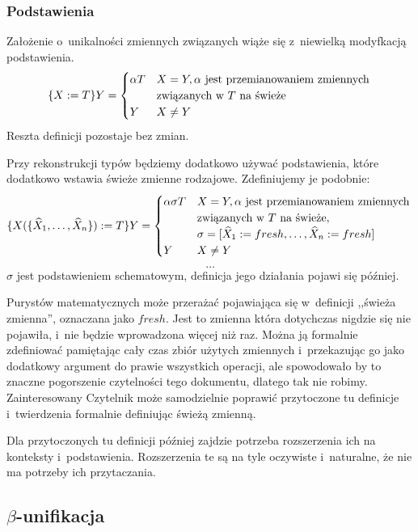 \documentclass[11pt,leqno]{article}
\begin{document}
\subsubsection{Podstawienia}

Założenie o~unikalności zmiennych związanych wiąże się z~niewielką modyfkacją podstawienia.
\[
\{X := T\} Y = 
	\begin{cases}
		\alpha T & X=Y, \alpha \ \textrm{jest przemianowaniem zmiennych} \\
		& \textrm{związanych w~$T$ na świeże} \\
		Y & X \neq Y
	\end{cases} \\
\]
Reszta definicji pozostaje bez zmian.

Przy rekonstrukcji typów będziemy dodatkowo używać podstawienia, które dodatkowo wstawia świeże zmienne rodzajowe.
Zdefiniujemy je podobnie:
\[
\{X(\{\widehat{X}_1, \dots, \widehat{X}_n\}) := T\} Y = 
	\begin{cases}
		\alpha \sigma T & X=Y, \alpha \ \textrm{jest przemianowaniem zmiennych} \\
		& \textrm{związanych w~$T$ na świeże}, \\
		& \sigma = [\widehat{X}_1 := fresh, \dots, \widehat{X}_n := fresh] \\
		Y & X \neq Y
	\end{cases} \\
\]
\[
\ldots
\]
$\sigma$ jest podstawieniem schematowym, definicja jego działania pojawi się później.

Purystów matematycznych może przerażać pojawiająca się w~definicji ,,świeża zmienna'', oznaczana
jako $fresh$. Jest to zmienna która dotychczas nigdzie się nie pojawiła, i~nie będzie wprowadzona więcej niż raz.
Można ją formalnie zdefiniować pamiętając cały czas zbiór użytych zmiennych i~przekazując go jako dodatkowy argument do prawie
wszystkich operacji, ale spowodowało by to znaczne pogorszenie czytelności tego dokumentu, dlatego tak nie robimy.
Zainteresowany Czytelnik może samodzielnie poprawić przytoczone tu definicje i~twierdzenia formalnie definiując świeżą zmienną.

Dla przytoczonych tu definicji później zajdzie potrzeba rozszerzenia ich na konteksty i~podstawienia.
Rozszerzenia te są na tyle oczywiste i~naturalne, że nie ma potrzeby ich przytaczania.

\subsection{$\beta$-unifikacja}
\end{document}
